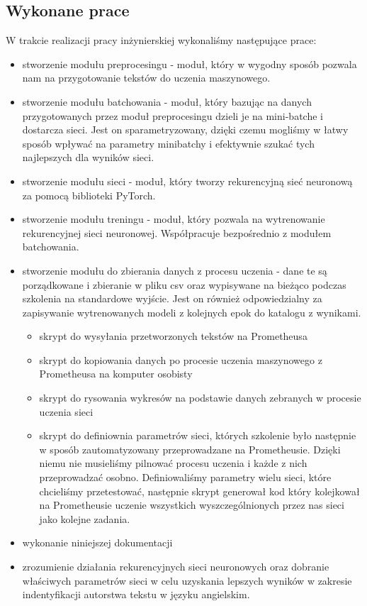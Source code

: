 \subsection{Wykonane prace}
W trakcie realizacji pracy inżynierskiej wykonaliśmy następujące prace:
\begin{itemize}
  \item stworzenie modułu preprocesingu - moduł, który w wygodny sposób pozwala nam na przygotowanie tekstów
  do uczenia maszynowego.
  \item stworzenie modułu batchowania - moduł, który bazując na danych przygotowanych przez moduł
  preprocesingu dzieli je na mini-batche i dostarcza sieci. Jest on sparametryzowany, dzięki czemu mogliśmy
  w łatwy sposób wpływać na parametry minibatchy i efektywnie szukać tych najlepszych dla wyników sieci.
  \item stworzenie modułu sieci - moduł, który tworzy rekurencyjną sieć neuronową za pomocą
  biblioteki PyTorch.
  \item stworzenie modułu treningu - moduł, który pozwala na wytrenowanie rekurencyjnej sieci neuronowej.
  Współpracuje bezpośrednio z modułem batchowania.
  \item stworzenie modułu do zbierania danych z procesu uczenia - dane te są porządkowane i
  zbieranie w pliku csv oraz wypisywane na bieżąco podczas szkolenia na standardowe wyjście.
  Jest on również odpowiedzialny za zapisywanie wytrenowanych modeli z kolejnych epok do katalogu z wynikami.
  \begin{itemize}
    \item skrypt do wysyłania przetworzonych tekstów na Prometheusa
    \item skrypt do kopiowania danych po procesie uczenia maszynowego z Prometheusa na komputer osobisty
    \item skrypt do rysowania wykresów na podstawie danych zebranych w procesie uczenia sieci
    \item skrypt do definiownia parametrów sieci, których szkolenie było następnie w sposób zautomatyzowany
     przeprowadzane na Prometheusie. Dzięki niemu nie musieliśmy pilnować procesu uczenia i
   	każde z nich przeprowadzać osobno. Definiowaliśmy parametry wielu sieci, które chcieliśmy przetestować,
   	następnie skrypt generował kod który kolejkował na Prometheusie uczenie wszystkich wyszczególnionych przez nas sieci
   	jako kolejne zadania.
  \end{itemize}
  \item wykonanie niniejszej dokumentacji
  \item zrozumienie działania rekurencyjnych sieci neuronowych oraz dobranie właściwych parametrów sieci
  w celu uzyskania lepszych wyników w zakresie indentyfikacji autorstwa tekstu w języku angielskim.
\end{itemize}



